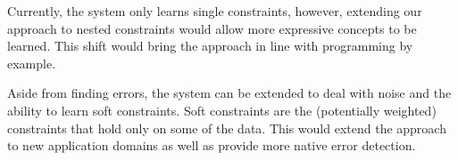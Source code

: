 \documentclass{sig-alternate-05-2015}
\begin{document}
Currently, the system only learns single constraints, however, extending our approach to nested constraints would allow more expressive concepts to be learned.
This shift would bring the approach in line with programming by example.

Aside from finding errors, the system can be extended to deal with noise and the ability to learn soft constraints.
Soft constraints are the (potentially weighted) constraints that hold only on some of the data.
This would extend the approach to new application domains as well as provide more native error detection.



\end{document}
